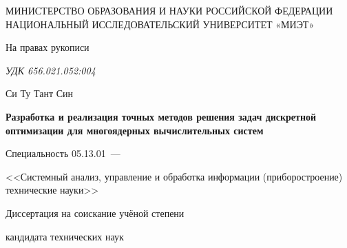 \thispagestyle{empty}%
\begin{center}%
\MakeUppercase{Министерство образования и науки Российской Федерации}\\
\MakeUppercase{Национальный исследовательский университет «МИЭТ»}
\end{center}%
%
\vspace{0pt plus3fill} %
\begin{flushright}%
На правах рукописи

\textsl {УДК 656.021.052:004}
\end{flushright}%
%
\vspace{0pt plus2fill} %
\begin{center}%
{\large Си Ту Тант Син}
\end{center}%
%
\vspace{0pt plus0fill} %
\begin{center}%
\textbf {\large Разработка и реализация точных методов решения задач дискретной оптимизации для многоядерных вычислительных систем}

\vspace{0pt plus2fill} %
{%
Специальность 05.13.01~--- 

<<Системный анализ, управление и обработка информации (приборостроение)
технические науки>>
}

\vspace{0pt plus2fill} %
Диссертация на соискание учёной степени

кандидата технических наук
\end{center}%
